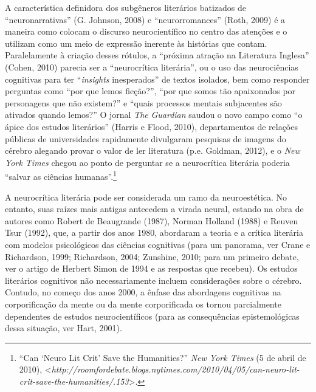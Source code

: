 A característica definidora dos subgêneros literários batizados de
``neuronarrativas'' (G. Johnson, 2008) e ``neurorromances'' (Roth, 2009)
é a maneira como colocam o discurso neurocientífico no centro das
atenções e o utilizam como um meio de expressão inerente às histórias
que contam. Paralelamente à criação desses rótulos, a ``próxima atração
na Literatura Inglesa'' (Cohen, 2010) parecia ser a ``neurocrítica
literária'', ou o uso das neurociências cognitivas para ter
``\emph{insights} inesperados'' de textos isolados, bem como responder
perguntas como ``por que lemos ficção?'', ``por que somos tão
apaixonados por personagens que não existem?'' e ``quais processos
mentais subjacentes são ativados quando lemos?'' O jornal \emph{The}
\emph{Guardian} saudou o novo campo como ``o ápice dos estudos
literários'' (Harris e Flood, 2010), departamentos de relações públicas
de universidades rapidamente divulgaram pesquisas de imagens do cérebro
alegando provar o valor de ler literatura (p.e. Goldman, 2012), e o
\emph{New York Times} chegou ao ponto de perguntar se a neurocrítica
literária poderia ``salvar as ciências humanas''.\footnote[2]{``Can `Neuro Lit Crit' Save the Humanities?'' \emph{New York Times}
(5 de abril de 2010),
\textless{}\emph{http://roomfordebate.blogs.nytimes.com/2010/04/05/can-neuro-lit-crit-save-the-humanities/.153}\textgreater{}.}

A neurocrítica literária pode ser considerada um ramo da neuroestética.
No entanto, suas raízes mais antigas antecedem a virada neural, estando
na obra de autores como Robert de Beaugrande (1987), Norman Holland
(1988) e Reuven Tsur (1992), que, a partir dos anos 1980, abordaram a
teoria e a crítica literária com modelos psicológicos das ciências
cognitivas (para um panorama, ver Crane e Richardson, 1999; Richardson,
2004; Zunshine, 2010; para um primeiro debate, ver o artigo de Herbert
Simon de 1994 e as respostas que recebeu). Os estudos literários
cognitivos não necessariamente incluem considerações sobre o cérebro.
Contudo, no começo dos anos 2000, a ênfase das abordagens cognitivas na
corporificação da mente ou da mente corporificada os tornou parcialmente
dependentes de estudos neurocientíficos (para as consequências
epistemológicas dessa situação, ver Hart, 2001).

